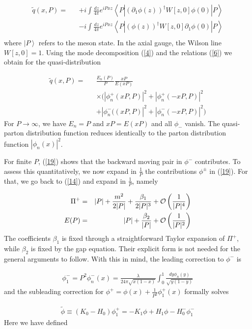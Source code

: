 \documentclass[showpacs,twocolumn,aps,preprintnumbers,letterpaper]{revtex4}
\newcommand{\be}{\begin{equation}}
\newcommand{\ee}{\end{equation}}
\def\be{\begin{eqnarray}}
\def\ee{\end{eqnarray}}
\begin{document}
\be
\label{18}
\tilde q(x,P)=&&+i\int \frac{dz}{4\pi}e^{iPxz}\left<P|(\partial_1 \phi(z))^{\dagger}W[z,0]\phi(0)|P\right>\nonumber \\ 
&&-i\int \frac{dz}{4\pi}e^{iPxz}\left<P|(\phi(z))^{\dagger}W[z,0]\partial_1\phi(0)|P\right>\nonumber\\
\ee
where $\left|P\right>$ refers to the meson state.  In the axial gauge, the Wilson line $W[z,0]=1$.
Using the mode decomposition (\ref{4}) and the relations (\ref{6}) we obtain for the quasi-distribution

\be
\label{19}
\tilde q(x,P)=&&\frac{E_n(P)}{P}\frac{xP}{E(xP)}\nonumber \\ 
&&\times \bigg(|\phi^{+}_n(xP,P)|^2+|\phi^{+}_n(-xP,P)|^2\nonumber \\
&& +|\phi^{-}_n((xP,P)|^2+|\phi^{-}_n(-xP,P)|^2\bigg)
\ee
For $P\rightarrow \infty$, we have $E_{n}=P$ and $xP=E(xP)$ and all $\phi_{-}$ vanish.
The quasi-parton distribution function reduces identically to the parton distribution function 
$|\phi_{n}(x)|^2$.

For finite $P$, (\ref{19}) shows that the backward moving pair in $\phi^-$ contributes. To assess
this quantitatively, 
we now expand in $\frac 1P$ the contributions $\phi^\pm$ in (\ref{19}). For that, we go back to 
(\ref{14})  and expand in $\frac 1P$, namely



\be
\label{19X}
\Pi^{+}=&&|P|+\frac{m^2}{2|P|}+\frac{\beta_1}{2|P|^3}+{\cal O}\left(\frac 1{|P|^4}\right)\nonumber\\
E(P)=&&|P|+\frac{\beta_2}{|P|}+{\cal O}\left(\frac 1{|P|^2}\right)
\ee
The coefficients $\beta_{1}$ is fixed through a straightforward Taylor expansion of $\Pi^+$, 
while $\beta_2$ is  fixed by the gap equation. Their explicit form is not needed for the
general arguments to follow. With this in mind, the leading correction to $\phi^-$ is

\be
\label{19XX}
\phi^-_1=P^2\phi_n^{-}(x)=\frac{\lambda}{24\pi \sqrt{x(1-x)}}\int_0^1 \frac{dy\phi_n(y)}{\sqrt{y(1-y)}}
\ee
and the subleading correction for $\phi^{+}=\phi(x)+\frac{1}{P^2}\phi^{+}_1(x)$ formally solves

\be
\label{19XXX}
\tilde \phi\equiv (K_0 -H_0)\phi_1^+=-K_1\phi+H_1\phi-H^{-}_0\phi_1^-
\ee
Here we have defined
\end{document}
